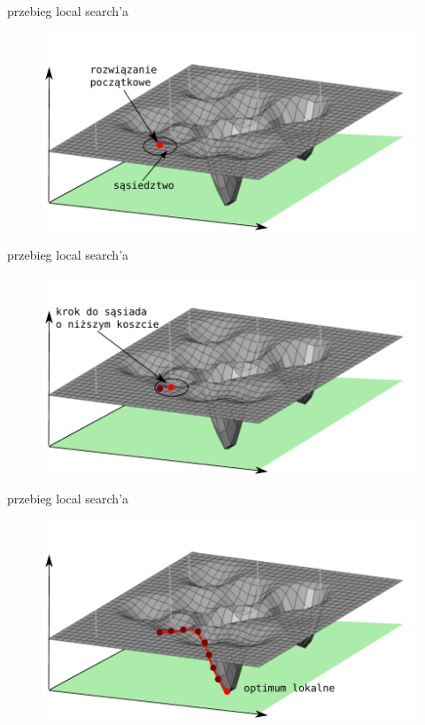 \documentclass[blue]{beamer}
\begin{document}
\begin{frame}{przebieg local search'a}
\begin{figure}
\includegraphics[scale=.7]{ss2.pdf}
\end{figure}
\end{frame}

\begin{frame}{przebieg local search'a}
\begin{figure}
\includegraphics[scale=.7]{ss3.pdf}
\end{figure}
\end{frame}

\begin{frame}{przebieg local search'a}
\begin{figure}
\includegraphics[scale=.7]{ss4.pdf}
\end{figure}
\end{frame}



\end{document}
